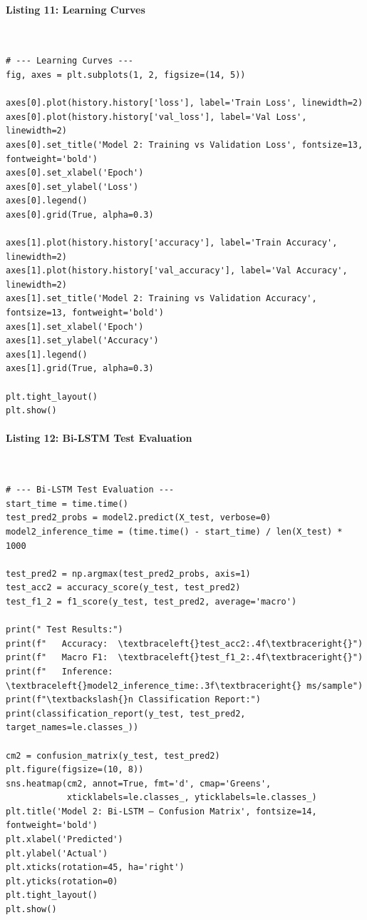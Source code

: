 \documentclass[12pt,a4paper,oneside]{report}
\begin{document}
\paragraph{Listing 11: Learning Curves}\mbox{}\\[-1ex]
\begin{Verbatim}[commandchars=\\\{\},breaklines=true,breakanywhere=true,fontsize=\scriptsize,frame=leftline,framesep=2mm,rulecolor=\color{gray}]
# --- Learning Curves ---
fig, axes = plt.subplots(1, 2, figsize=(14, 5))

axes[0].plot(history.history['loss'], label='Train Loss', linewidth=2)
axes[0].plot(history.history['val_loss'], label='Val Loss', linewidth=2)
axes[0].set_title('Model 2: Training vs Validation Loss', fontsize=13, fontweight='bold')
axes[0].set_xlabel('Epoch')
axes[0].set_ylabel('Loss')
axes[0].legend()
axes[0].grid(True, alpha=0.3)

axes[1].plot(history.history['accuracy'], label='Train Accuracy', linewidth=2)
axes[1].plot(history.history['val_accuracy'], label='Val Accuracy', linewidth=2)
axes[1].set_title('Model 2: Training vs Validation Accuracy', fontsize=13, fontweight='bold')
axes[1].set_xlabel('Epoch')
axes[1].set_ylabel('Accuracy')
axes[1].legend()
axes[1].grid(True, alpha=0.3)

plt.tight_layout()
plt.show()
\end{Verbatim}
\paragraph{Listing 12: Bi-LSTM Test Evaluation}\mbox{}\\[-1ex]
\begin{Verbatim}[commandchars=\\\{\},breaklines=true,breakanywhere=true,fontsize=\scriptsize,frame=leftline,framesep=2mm,rulecolor=\color{gray}]
# --- Bi-LSTM Test Evaluation ---
start_time = time.time()
test_pred2_probs = model2.predict(X_test, verbose=0)
model2_inference_time = (time.time() - start_time) / len(X_test) * 1000

test_pred2 = np.argmax(test_pred2_probs, axis=1)
test_acc2 = accuracy_score(y_test, test_pred2)
test_f1_2 = f1_score(y_test, test_pred2, average='macro')

print(" Test Results:")
print(f"   Accuracy:  \textbraceleft{}test_acc2:.4f\textbraceright{}")
print(f"   Macro F1:  \textbraceleft{}test_f1_2:.4f\textbraceright{}")
print(f"   Inference:  \textbraceleft{}model2_inference_time:.3f\textbraceright{} ms/sample")
print(f"\textbackslash{}n Classification Report:")
print(classification_report(y_test, test_pred2, target_names=le.classes_))

cm2 = confusion_matrix(y_test, test_pred2)
plt.figure(figsize=(10, 8))
sns.heatmap(cm2, annot=True, fmt='d', cmap='Greens',
            xticklabels=le.classes_, yticklabels=le.classes_)
plt.title('Model 2: Bi-LSTM — Confusion Matrix', fontsize=14, fontweight='bold')
plt.xlabel('Predicted')
plt.ylabel('Actual')
plt.xticks(rotation=45, ha='right')
plt.yticks(rotation=0)
plt.tight_layout()
plt.show()
\end{Verbatim}
\end{document}
